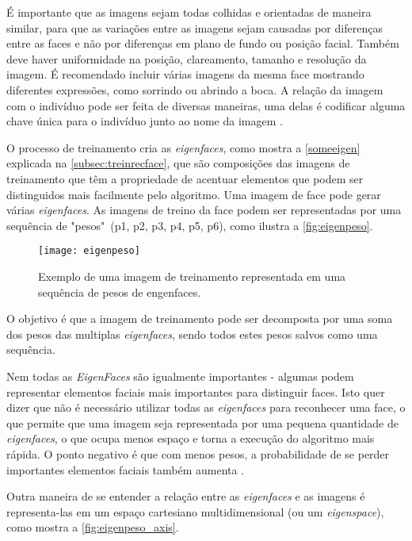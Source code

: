 É importante que as imagens sejam todas colhidas e orientadas de maneira similar, para que as variações entre as imagens sejam causadas por diferenças entre as faces e não por diferenças  em plano de fundo ou posição facial. Também deve haver uniformidade na posição, clareamento, tamanho e resolução da imagem. É recomendado incluir várias imagens da mesma face mostrando diferentes expressões, como sorrindo ou abrindo a boca. A relação da imagem com o indivíduo pode ser feita de diversas maneiras, uma delas é codificar alguma chave única para o indivíduo junto ao nome da imagem \cite{drmathew_java_programming}. 

O processo de treinamento cria as \textit{eigenfaces}, como mostra a \autoref{someeigen} explicada na  \autoref{subsec:treinrecface}, que são composições das imagens de treinamento que têm a propriedade de acentuar elementos que podem ser distinguidos mais facilmente pelo algoritmo. Uma imagem de face pode gerar várias \textit{eigenfaces}. As imagens de treino da face podem ser representadas por uma sequência de "pesos"\ (p1, p2, p3, p4, p5, p6), como ilustra a \autoref{fig:eigenpeso}.

\begin{figure}[h]
	\centering
	\texttt{[image: eigenpeso]}
	\caption{Exemplo de uma imagem de treinamento representada em uma sequência de pesos de engenfaces.}
	\label{fig:eigenpeso}
\end{figure}

O objetivo é que a imagem de treinamento pode ser decomposta por uma soma dos pesos das multiplas \textit{eigenfaces}, sendo todos estes pesos salvos como uma sequência.

Nem todas as \textit{EigenFaces} são igualmente importantes - algumas podem representar elementos faciais mais importantes para distinguir faces. Isto quer dizer que não é necessário utilizar todas as \textit{eigenfaces} para reconhecer uma face, o que permite que uma imagem seja representada por uma pequena quantidade de \textit{eigenfaces}, o que ocupa menos espaço e torna a execução do algoritmo mais rápida. O ponto negativo é que com menos pesos, a probabilidade de se perder importantes elementos faciais também aumenta \cite{drmathew_java_programming}.

Outra maneira de se entender a relação entre as \textit{eigenfaces} e as imagens é representa-las em um espaço cartesiano multidimensional (ou um \textit{\textit{eigenspace}}), como mostra a \autoref{fig:eigenpeso_axis}.

